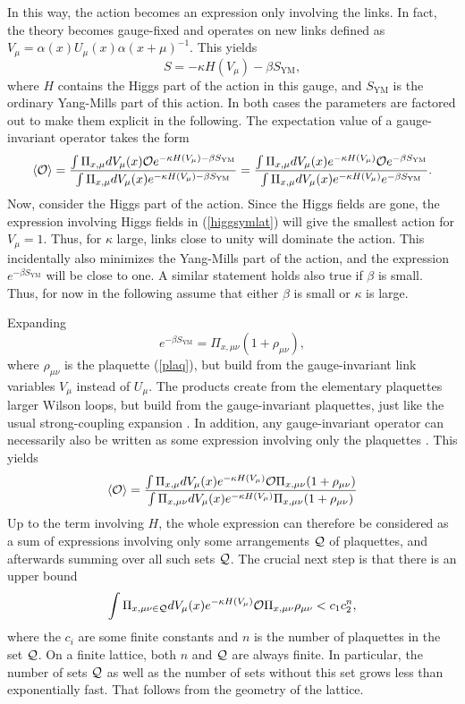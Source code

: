 \documentclass[final,12pt]{article}
\newcommand*{\no}{\noindent}
\newcommand*{\be}{\begin{equation}}
\newcommand*{\ee}{\end{equation}}
\newcommand*{\pref}[1]{(\ref{#1})}
\newcommand*{\mn}{{\mu\nu}}
\newcommand*{\nn}{\nonumber}
\newcommand*{\1}{1\!\!\!\bot}
\newcommand*{\la}{\left\langle}
\newcommand*{\ra}{\right\rangle}
\newcommand*{\op}{{\cal O}}
\newcommand*{\ym}{{\text{YM}}}
\begin{document}
In this way, the action becomes an expression only involving the links. In fact, the theory becomes gauge-fixed and operates on new links defined as $V_\mu=\alpha(x) U_\mu(x)\alpha(x+\mu)^{-1}$. This yields
\be
S=-\kappa H(V_\mu)-\beta S_\ym\nn,
\ee
\no where $H$ contains the Higgs part of the action in this gauge, and $S_\text{YM}$ is the ordinary Yang-Mills part of this action. In both cases the parameters are factored out to make them explicit in the following. The expectation value of a gauge-invariant operator takes the form
\be
\la\op\ra=\frac{\int\Pi_{x,\mu}dV_\mu(x)\op e^{-\kappa H(V_\mu)-\beta S_\ym}}{\int\Pi_{x,\mu}dV_\mu(x) e^{-\kappa H(V_\mu)-\beta S_\ym}}=\frac{\int\Pi_{x,\mu}dV_\mu(x)e^{-\kappa H(V_\mu)}\op e^{-\beta S_\ym}}{\int\Pi_{x,\mu}dV_\mu(x) e^{-\kappa H(V_\mu)}e^{-\beta S_\ym}}\nn.
\ee
\no Now, consider the Higgs part of the action. Since the Higgs fields are gone, the expression involving Higgs fields in \pref{higgsymlat} will give the smallest action for $V_\mu=1$. Thus, for $\kappa$ large, links close to unity will dominate the action. This incidentally also minimizes the Yang-Mills part of the action, and the expression $e^{-\beta S_\ym}$ will be close to one. A similar statement holds also true if $\beta$ is small. Thus, for now in the following assume that either $\beta$ is small or $\kappa$ is large.

Expanding
\be
e^{-\beta S_\ym}=\Pi_{x,\mn}(1+\rho_\mn)\nn,
\ee
\no where $\rho_\mn$ is the plaquette \pref{plaq}, but build from the gauge-invariant link variables $V_\mu$ instead of $U_\mu$. The products create from the elementary plaquettes larger Wilson loops, but build from the gauge-invariant plaquettes, just like the usual strong-coupling expansion \cite{Montvay:1994cy}. In addition, any gauge-invariant operator can necessarily also be written as some expression involving only the plaquettes \cite{Montvay:1994cy}. This yields \cite{Osterwalder:1977pc}
\be
\la\op\ra=\frac{\int\Pi_{x,\mu}dV_\mu(x)e^{-\kappa H(V_\mu)}\op \Pi_{x,\mn}(1+\rho_\mn)}{\int\Pi_{x,\mn}dV_\mu(x) e^{-\kappa H(V_\mu)}\Pi_{x,\mn}(1+\rho_\mn)}\nn
\ee
\no Up to the term involving $H$, the whole expression can therefore be considered as a sum of expressions involving only some arrangements ${\cal Q}$ of plaquettes, and afterwards summing over all such sets ${\cal Q}$. The crucial next step is that there is an upper bound \cite{Osterwalder:1977pc}
\be
\int\Pi_{{x,\mn}\in{\cal Q}}dV_\mu(x)e^{-\kappa H(V_\mu)}\op \Pi_{x,\mn}\rho_\mn< c_1c_2^n\nn,
\ee
\no where the $c_i$ are some finite constants and $n$ is the number of plaquettes in the set ${\cal Q}$. On a finite lattice, both $n$ and ${\cal Q}$ are always finite. In particular, the number of sets ${\cal Q}$ as well as the number of sets without this set grows less than exponentially fast. That follows from the geometry of the lattice.
\end{document}
